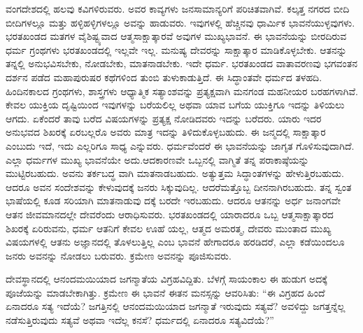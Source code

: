 ವಂಗದೇಶದಲ್ಲಿ ಹಲವು ಕವಿಗಳಿರುವರು. ಅವರ ಕಾವ್ಯಗಳು ಜನಸಾಮಾನ್ಯರಿಗೆ ಪರಿಚಿತವಾಗಿವೆ. ಕಲ್ಕತ್ತ ನಗರದ ಬೀದಿ ಬೀದಿಗಳಲ್ಲೂ ಮತ್ತು ಹಳ್ಳಿಹಳ್ಳಿಗಳಲ್ಲೂ ಅವನ್ನು ಹಾಡುವರು. ಇವುಗಳಲ್ಲಿ ಹೆಚ್ಚಿನವು ಧಾರ್ಮಿಕ ಭಾವನೆಯುಳ್ಳವುಗಳು. ಭರತಖಂಡದ ಮತಗಳ ವೈಶಿಷ್ಟ್ಯವಾದ ಆತ್ಮಸಾಕ್ಷಾತ್ಕಾರವೆ ಅವುಗಳ ಮುಖ್ಯಭಾವನೆ. ಈ ಭಾವನೆಯನ್ನು ಬೀರದಿರುವ ಧರ್ಮ ಗ್ರಂಥಗಳು ಭರತಖಂಡದಲ್ಲಿ ಇಲ್ಲವೇ ಇಲ್ಲ. ಮನುಷ್ಯ ದೇವರನ್ನು ಸಾಕ್ಷಾತ್ಕಾರ ಮಾಡಿಕೊಳ್ಳಬೇಕು. ಆತನನ್ನು ತನ್ನಲ್ಲಿ ಅನುಭವಿಸಬೇಕು, ನೋಡಬೇಕು, ಮಾತನಾಡಬೇಕು. ಇದೇ ಧರ್ಮ. ಭರತಖಂಡದ ವಾತಾವರಣವು ಭಗವಂತನ ದರ್ಶನ ಪಡೆದ ಮಹಾಪುರುಷರ ಕಥೆಗಳಿಂದ ತುಂಬಿ ತುಳುಕಾಡುತ್ತಿದೆ. ಈ ಸಿದ್ಧಾಂತವೇ ಧರ್ಮದ ತಳಹದಿ. ಹಿಂದಿನಕಾಲದ ಗ್ರಂಥಗಳು, ಶಾಸ್ತ್ರಗಳು ಆಧ್ಯಾತ್ಮಿಕ ಸತ್ಯಾಂಶವನ್ನು ಪ್ರತ್ಯಕ್ಷವಾಗಿ ಮನಗಂಡ ಮಹನೀಯರ ಬರಹಗಳಾಗಿವೆ. ಕೇವಲ ಯುಕ್ತಿಯ ದೃಷ್ಟಿಯಿಂದ ಇವುಗಳನ್ನು ಬರೆಯಲಿಲ್ಲ ಅಥವಾ ಯಾವ ಬಗೆಯ ಯುಕ್ತಿಗೂ ಇದನ್ನು ತಿಳಿಯಲು ಆಗದು. ಏಕೆಂದರೆ ತಾವು ಬರೆದ ವಿಷಯಗಳನ್ನು ಪ್ರತ್ಯಕ್ಷ ನೋಡಿದವರು ಇದನ್ನು ಬರೆದರು. ಯಾರು ಇದರ ಅನುಭವದ ಶಿಖರಕ್ಕೆ ಏರಬಲ್ಲರೊ ಅವರು ಮಾತ್ರ ಇದನ್ನು ತಿಳಿದುಕೊಳ್ಳಬಹುದು. ಈ ಜನ್ಮದಲ್ಲಿ ಸಾಕ್ಷಾತ್ಕಾರ ಎಂಬುದು ಇದೆ, ಇದು ಎಲ್ಲರಿಗೂ ಸಾಧ್ಯ ಎನ್ನುವರು. ಧರ್ಮವೆಂದರೆ ಈ ಭಾವನೆಯನ್ನು ಜಾಗೃತ ಗೊಳಿಸುವುದಾಗಿದೆ. ಎಲ್ಲಾ ಧರ್ಮಗಳ ಮುಖ್ಯ ಭಾವನೆಯೇ ಅದು.ಆದಕಾರಣವೇ ಒಬ್ಬನಲ್ಲಿ ವಾಗ್ಮಿತೆ ತನ್ನ ಪರಾಕಾಷ್ಠೆಯನ್ನು ಮುಟ್ಟಿರಬಹುದು. ಅವನು ತರ್ಕಬದ್ಧ ವಾಗಿ ಮಾತನಾಡಬಹುದು. ಅತ್ಯುತ್ತಮ ಸಿದ್ಧಾಂತಗಳನ್ನು ಹೇಳುತ್ತಿರಬಹುದು. ಆದರೂ ಅವನ ಸಂದೇಶವನ್ನು ಕೇಳುವುದಕ್ಕೆ ಜನರು ಸಿಕ್ಕುವುದಿಲ್ಲ. ಆದರೆಮತ್ತೊಬ್ಬ ದೀನನಾಗಿರಬಹುದು. ತನ್ನ ಸ್ವಂತ ಭಾಷೆಯಲ್ಲಿ ಕೂಡ ಸರಿಯಾಗಿ ಮಾತನಾಡುವು ದಕ್ಕೆ ಬರದೇ ಇರಬಹುದು. ಆದರೂ ಆತನನ್ನು ಅರ್ಧ ಜನಾಂಗವೇ ಆತನ ಜೀವಮಾನದಲ್ಲೇ ದೇವರೆಂದು ಆರಾಧಿಸುವರು. ಭರತಖಂಡದಲ್ಲಿ ಯಾರಾದರೂ ಒಬ್ಬ ಆತ್ಮಸಾಕ್ಷಾತ್ಕಾರದ ಶಿಖರಕ್ಕೆ ಏರಿರುವನು, ಧರ್ಮ ಆತನಿಗೆ ಕೇವಲ ಊಹೆ ಯಲ್ಲ, ಆತ್ಮದ ಅಮರತ್ಮ, ದೇವರು ಮುಂತಾದ ಮುಖ್ಯ ವಿಷಯಗಳಲ್ಲಿ ಆತನು ಅಜ್ಞಾನದಲ್ಲಿ ತೊಳಲುತ್ತಿಲ್ಲ ಎಂಬ ಭಾವನೆ ಹೇಗಾದರೂ ಹರಡಿದರೆ, ಎಲ್ಲಾ ಕಡೆಯಿಂದಲೂ ಜನರು ಅವನನ್ನು ನೋಡಲು ಬರುವರು. ಕ್ರಮೇಣ ಅವನನ್ನು ಪೂಜಿಸುವರು.

ದೇವಸ್ಥಾನದಲ್ಲಿ ಆನಂದಮಯಿಯಾದ ಜಗನ್ಮಾತೆಯ ವಿಗ್ರಹವಿದ್ದಿತು. ಬೆಳಗ್ಗೆ ಸಾಯಂಕಾಲ ಈ ಹುಡುಗ ಅದಕ್ಕೆ ಪೂಜೆಯನ್ನು ಮಾಡಬೇಕಾಗಿತ್ತು. ಕ್ರಮೇಣ ಈ ಭಾವನೆ ಈತನ ಮನಸ್ಸನ್ನು ಆವರಿಸಿತು: “ಈ ವಿಗ್ರಹದ ಹಿಂದೆ ಏನಾದರೂ ಸತ್ಯ ಇದೆಯೆ? ಜಗತ್ತಿನಲ್ಲಿ ಆನಂದಮಯಿಯಾದ ಜಗನ್ಮಾತೆ ಇರುವುದು ಸತ್ಯವೆ? ಅವಳಿದ್ದು ಜಗತ್ತನ್ನೆಲ್ಲ ನಡೆಸುತ್ತಿರುವುದು ಸತ್ಯವೆ ಅಥವಾ ಇದೆಲ್ಲ ಕನಸೆ? ಧರ್ಮದಲ್ಲಿ ಏನಾದರೂ ಸತ್ಯವಿದೆಯೆ?”

